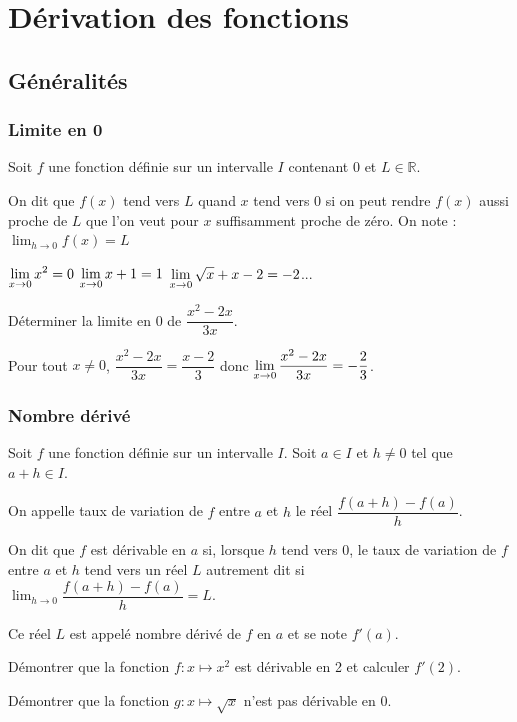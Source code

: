 \documentclass[french]{book}
\newcommand{\R}{\mathbb {R}}
\newcommand{\ds}{\displaystyle}
\newcommand{\limo}[1][x]{\ds\lim_{#1\rightarrow 0}}
\begin{document}
\setcounter{chapter}{2}
\chapter{Dérivation des fonctions}
\section{Généralités}
\subsection{Limite en 0}
\begin{defn}
Soit $f$ une fonction définie sur un intervalle $I$ contenant 0 et $L \in \R$.

On dit que $f(x)$ tend vers $L$ quand $x$ tend vers 0 si on peut rendre $f(x)$ aussi proche de $L$ que l'on veut pour $x$ suffisamment proche de zéro. On note : $\limo[h] f(x)=L$
\end{defn}

\begin{exemple}
$\ds \limo[x]x^{2}=0$ \hspace{1em} $\ds \limo[x]x+1=1$ \hspace{1em} $\ds \limo[x]\sqrt{x}+x-2=-2$...

Déterminer la limite en 0 de $\dfrac{x^{2}-2x}{3x}$.
\end{exemple}


Pour tout $x\neq 0$, $\dfrac{x^{2}-2x}{3x}=\dfrac{x-2}{3}$ donc $\ds \limo[x]\dfrac{x^{2}-2x}{3x}=-\dfrac{2}{3}$.

%
\subsection{Nombre dérivé}
\begin{defn}
Soit $f$ une fonction définie sur un intervalle $I$. Soit $a \in I$ et $h \neq 0$ tel que $a+h \in I$.

On appelle taux de variation de $f$ entre $a$ et $h$ le réel $\dfrac{f(a+h)-f(a)}{h}$.

On dit que $f$ est dérivable en $a$ si, lorsque $h$ tend vers 0, le taux de variation de $f$ entre $a$ et $h$ tend vers un réel $L$ autrement dit si $\ds \lim_{h\rightarrow 0}\dfrac{f(a+h)-f(a)}{h}=L$.

Ce réel $L$ est appelé nombre dérivé de $f$ en $a$ et se note $f'(a)$.
\end{defn}

\begin{exemple}
Démontrer que la fonction $f : x \longmapsto x^{2}$ est dérivable en 2 et calculer $f'(2)$.

Démontrer que la fonction $g : x \longmapsto \sqrt{x}$ n'est pas dérivable en 0.
\end{exemple}
\end{document}
